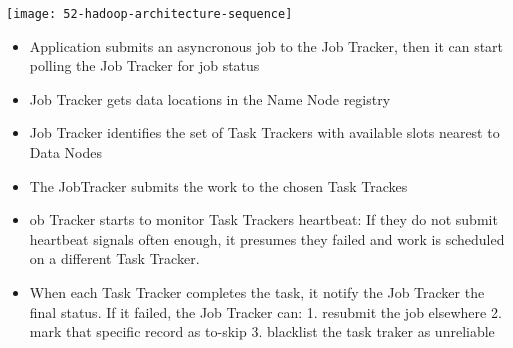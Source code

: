 \begin{center}
\texttt{[image: 52-hadoop-architecture-sequence]}
\end{center}

\begin{itemize}
	\item Application submits an asyncronous job to the Job Tracker, then it can start polling the Job Tracker for job status
	\item Job Tracker gets data locations in the Name Node registry
	\item Job Tracker identifies the set of Task Trackers with available slots nearest to Data Nodes
	\item The JobTracker submits the work to the chosen Task Trackes
	\item ob Tracker starts to monitor Task Trackers heartbeat: If they do not submit heartbeat signals often enough, it presumes they failed and work is scheduled on a different Task Tracker.
	\item When each Task Tracker completes the task, it notify the Job Tracker the final status. If it failed, the Job Tracker can:
	1. resubmit the job elsewhere
	2. mark that specific record as to-skip
	3. blacklist the task traker as unreliable
\end{itemize}

